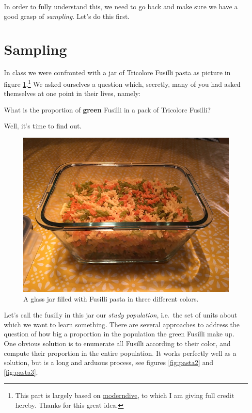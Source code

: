 \documentclass[]{book}
\newenvironment{tip}{\begin{tcolorbox}[colback=green!5!white,colframe=green]}{\end{tcolorbox}}
\begin{document}
In order to fully understand this, we need to go back and make sure we
have a good grasp of \emph{sampling}. Let's do this first.

\section{Sampling}\label{sampling}

In class we were confronted with a jar of Tricolore Fusilli pasta as
picture in figure \ref{fig:pasta1}.\footnote{This part is largely based
  on \href{https://moderndive.com/7-sampling.html}{moderndive}, to which
  I am giving full credit hereby. Thanks for this great idea.} We asked
ourselves a question which, secretly, many of you had asked themselves
at one point in their lives, namely:

\begin{tip}
What is the proportion of \textbf{green} Fusilli in a pack of Tricolore
Fusilli?
\end{tip}

Well, it's time to find out.

\begin{figure}
\includegraphics[width=0.9\linewidth]{images/pasta1} \caption{A glass jar filled with Fusilli pasta in three different colors.}\label{fig:pasta1}
\end{figure}

Let's call the fusilly in this jar our \emph{study population}, i.e.~the
set of units about which we want to learn something. There are several
approaches to address the question of how big a proportion in the
population the green Fusilli make up. One obvious solution is to
enumerate all Fusilli according to their color, and compute their
proportion in the entire population. It works perfectly well as a
solution, but is a long and arduous process, see figures
\ref{fig:pasta2} and \ref{fig:pasta3}.
\end{document}
